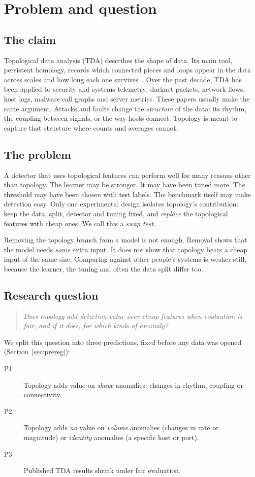 \section{Problem and question}
\label{sec:intro}

\subsection{The claim}
Topological data analysis (TDA) describes the shape of data. Its main tool, persistent homology, records which connected pieces and loops appear in the data across scales and how long each one survives~\cite{edelsbrunner2002persistence,A01,carlsson2009topology}. Over the past decade, TDA has been applied to security and systems telemetry: darknet packets, network flows, host logs, malware call graphs and server metrics. These papers usually make the same argument. Attacks and faults change the \emph{structure} of the data: its rhythm, the coupling between signals, or the way hosts connect. Topology is meant to capture that structure where counts and averages cannot.

\subsection{The problem}
A detector that uses topological features can perform well for many reasons other than topology. The learner may be stronger. It may have been tuned more. The threshold may have been chosen with test labels. The benchmark itself may make detection easy. Only one experimental design isolates topology's contribution: keep the data, split, detector and tuning fixed, and \emph{replace} the topological features with cheap ones. We call this a \emph{swap test}.

Removing the topology branch from a model is not enough. Removal shows that the model needs \emph{some} extra input. It does not show that topology beats a cheap input of the same size. Comparing against other people's systems is weaker still, because the learner, the tuning and often the data split differ too.

\subsection{Research question}
\begin{quote}
\emph{Does topology add detection value over cheap features when evaluation is fair, and if it does, for which kinds of anomaly?}
\end{quote}
We split this question into three predictions, fixed before any data was opened (Section~\ref{sec:prereg}):
\begin{description}
  \item[P1] Topology adds value on \emph{shape} anomalies: changes in rhythm, coupling or connectivity.
  \item[P2] Topology adds \emph{no} value on \emph{volume} anomalies (changes in rate or magnitude) or \emph{identity} anomalies (a specific host or port).
  \item[P3] Published TDA results shrink under fair evaluation.
\end{description}

